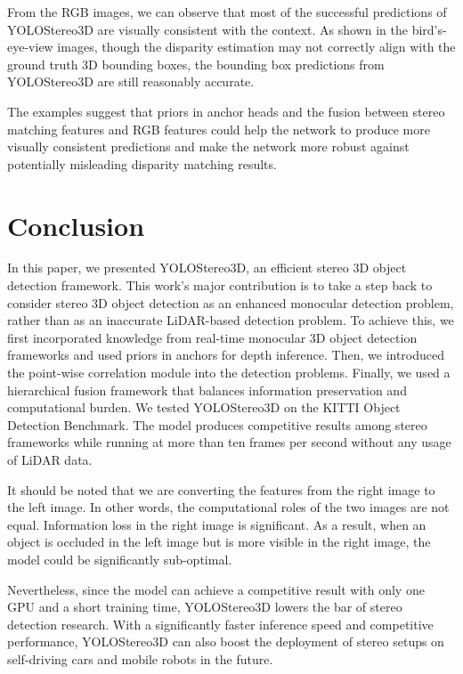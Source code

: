\documentclass[letterpaper, 10 pt, conference]{ieeeconf}
\begin{document}
From the RGB images, we can observe that most of the successful predictions of YOLOStereo3D are visually consistent with the context. As shown in the bird's-eye-view images, though the disparity estimation may not correctly align with the ground truth 3D bounding boxes, the bounding box predictions from YOLOStereo3D are still reasonably accurate. 

The examples suggest that priors in anchor heads and the fusion between stereo matching features and RGB features could help the network to produce more visually consistent predictions and make the network more robust against potentially misleading disparity matching results.


 \section{Conclusion}
\label{section:Conclusion}
In this paper, we presented YOLOStereo3D, an efficient stereo 3D object detection framework.
This work's major contribution is to take a step back to consider stereo 3D object detection as an enhanced monocular detection problem, rather than as an inaccurate LiDAR-based detection problem.
To achieve this, we first incorporated knowledge from real-time monocular 3D object detection frameworks and used priors in anchors for depth inference.
Then, we introduced the point-wise correlation module into the detection problems.
Finally, we used a hierarchical fusion framework that balances information preservation and computational burden.
We tested YOLOStereo3D on the KITTI Object Detection Benchmark.
The model produces competitive results among stereo frameworks while running at more than ten frames per second without any usage of LiDAR data.

It should be noted that we are converting the features from the right image to the left image.
In other words, the computational roles of the two images are not equal. Information loss in the right image is significant.
As a result, when an object is occluded in the left image but is more visible in the right image, the model could be significantly sub-optimal.

Nevertheless, since the model can achieve a competitive result with only one GPU and a short training time, YOLOStereo3D lowers the bar of stereo detection research. With a significantly faster inference speed and competitive performance, YOLOStereo3D can also boost the deployment of stereo setups on self-driving cars and mobile robots in the future. 




\addtolength{\textheight}{-7cm}


\balance
\end{document}
